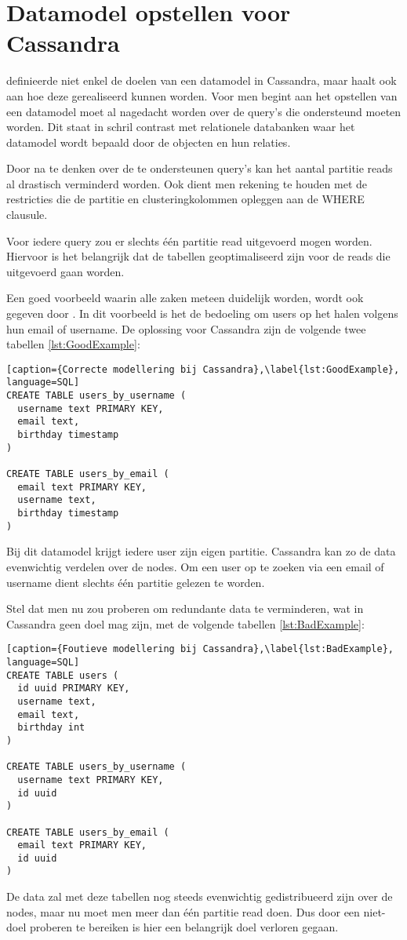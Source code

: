 \section{Datamodel opstellen voor Cassandra}
\cite{Hobbs2015Datamodelling} definieerde niet enkel de doelen van een datamodel in Cassandra, maar haalt ook aan hoe deze gerealiseerd kunnen worden.
Voor men begint aan het opstellen van een datamodel moet al nagedacht worden over de query's die ondersteund moeten worden.
Dit staat in schril contrast met relationele databanken waar het datamodel wordt bepaald door de objecten en hun relaties.

Door na te denken over de te ondersteunen query's kan het aantal partitie reads al drastisch verminderd worden.
Ook dient men rekening te houden met de restricties die de partitie en clusteringkolommen opleggen aan de WHERE clausule.

Voor iedere query zou er slechts één partitie read uitgevoerd mogen worden.
Hiervoor is het belangrijk dat de tabellen geoptimaliseerd zijn voor de reads die uitgevoerd gaan worden.

Een goed voorbeeld waarin alle zaken meteen duidelijk worden, wordt ook gegeven door \cite{Hobbs2015Datamodelling} .
In dit voorbeeld is het de bedoeling om users op het halen volgens hun email of username.
De oplossing voor Cassandra zijn de volgende twee tabellen \ref{lst:GoodExample}:

\begin{lstlisting}[caption={Correcte modellering bij Cassandra},\label{lst:GoodExample}, language=SQL]
CREATE TABLE users_by_username (
  username text PRIMARY KEY,
  email text,
  birthday timestamp
)

CREATE TABLE users_by_email (
  email text PRIMARY KEY,
  username text,
  birthday timestamp
)
\end{lstlisting}

Bij dit datamodel krijgt iedere user zijn eigen partitie.
Cassandra kan zo de data evenwichtig verdelen over de nodes.
Om een user op te zoeken via een email of username dient slechts één partitie gelezen te worden.

Stel dat men nu zou proberen om redundante data te verminderen, wat in Cassandra geen doel mag zijn, met de volgende tabellen \ref{lst:BadExample}:

\begin{lstlisting}[caption={Foutieve modellering bij Cassandra},\label{lst:BadExample}, language=SQL]
CREATE TABLE users (
  id uuid PRIMARY KEY,
  username text,
  email text,
  birthday int
)

CREATE TABLE users_by_username (
  username text PRIMARY KEY,
  id uuid
)

CREATE TABLE users_by_email (
  email text PRIMARY KEY,
  id uuid
)
\end{lstlisting}

De data zal met deze tabellen nog steeds evenwichtig gedistribueerd zijn over de nodes, maar nu moet men meer dan één partitie read doen.
Dus door een niet-doel proberen te bereiken is hier een belangrijk doel verloren gegaan.
